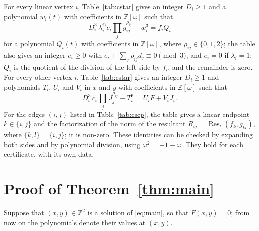 \documentclass[11pt]{article}
\newcommand{\Z}{\mathbb{Z}}
\begin{document}
For every linear vertex $i$, Table~\ref{tab:cstar} gives an integer $D_i\geq1$ and a polynomial $w_i(t)$ with coefficients in $\Z[\omega]$ such that
\begin{equation}\label{eq:cstarlin}
D_i^3\,\lambda_i^{e_i}c_i\prod_jg_{ij}^{\rho_{ij}}-w_i^3=f_iQ_i
\end{equation}
for a polynomial $Q_i(t)$ with coefficients in $\Z[\omega]$, where $\rho_{ij}\in\{0,1,2\}$; the table also gives an integer $e_i\geq0$ with $e_i+\sum_j\rho_{ij}d_j\equiv0\pmod3$, and $e_i=0$ if $\lambda_i=1$; $Q_i$ is the quotient of the division of the left side by $f_i$, and the remainder is zero.
For every other vertex $i$, Table~\ref{tab:cstar} gives an integer $D_i\geq1$ and polynomials $T_i$, $U_i$ and $V_i$ in $x$ and $y$ with coefficients in $\Z[\omega]$ such that
\begin{equation}\label{eq:cstar}
D_i^3\,c_i\prod_jJ_j^{\rho_{ij}}-T_i^3=U_iF+V_iJ_i.
\end{equation}
For the edges $(i,j)$ listed in Table~\ref{tab:csep}, the table gives a linear endpoint $k\in\{i,j\}$ and the factorization of the norm of the resultant $R_{ij}=\operatorname{Res}_t(f_k,g_{kl})$, where $\{k,l\}=\{i,j\}$; it is non-zero.
These identities can be checked by expanding both sides and by polynomial division, using $\omega^2=-1-\omega$. They hold for each certificate, with its own data.

\section{Proof of Theorem~\ref{thm:main}}

Suppose that $(x,y)\in\Z^2$ is a solution of \eqref{eq:main}, so that $F(x,y)=0$; from now on the polynomials denote their values at $(x,y)$.
\end{document}
